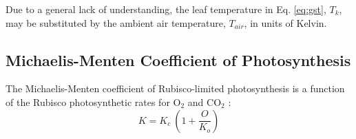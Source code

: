 \noindent Due to a general lack of understanding, the leaf temperature in Eq. \ref{eq:gst}, $T_k$, may be substituted by the ambient air temperature, $T_{air}$, in units of Kelvin. 

\subsection{Michaelis-Menten Coefficient of Photosynthesis}
\label{sec:k}
%
The Michaelis-Menten coefficient of Rubisco-limited photosynthesis is a function of the Rubisco photosynthetic rates for O$_2$ and CO$_2$ \parencite{farquhar80}:
\begin{equation}
\label{eq:michaelis}
	K = K_c\: \left( 1 + \frac{O}{K_o} \right)
\end{equation}

